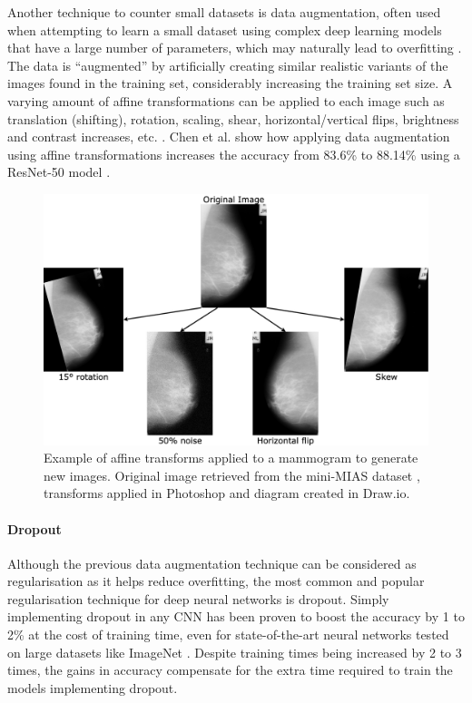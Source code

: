 Another technique to counter small datasets is data augmentation, often used when attempting to learn a small dataset using complex deep learning models that have a large number of parameters, which may naturally lead to overfitting \citep{Jadoon2017}. The data is ``augmented'' by artificially creating similar realistic variants of the images found in the training set, considerably increasing the training set size. A varying amount of affine transformations can be applied to each image such as translation (shifting), rotation, scaling, shear, horizontal/vertical flips, brightness and contrast increases, etc. \citep{Geron2019}. Chen et al. show how applying data augmentation using affine transformations increases the accuracy from 83.6\% to 88.14\% using a ResNet-50 model \citep{Chen2019}.

\begin{figure}[ht]
\centerline{\includegraphics[width=\textwidth]{figures/litsurvey/Data augmentation example.png}}
\caption{\label{fig:litsurvey-Data augmentation example}Example of affine transforms applied to a mammogram to generate new images. Original image retrieved from the mini-MIAS dataset \citep{Suckling1994}, transforms applied in Photoshop and diagram created in Draw.io.}
\end{figure}

\paragraph{Dropout}

Although the previous data augmentation technique can be considered as regularisation as it  helps reduce overfitting, the most common and popular regularisation technique for deep neural networks is dropout. Simply implementing dropout in any CNN has been proven to boost the accuracy by 1 to 2\% \citep{Geron2019} at the cost of training time, even for state-of-the-art neural networks tested on large datasets like ImageNet \citep{Srivastava2014}. Despite training times being increased by 2 to 3 times, the gains in accuracy compensate for the extra time required to train the models implementing dropout.\\

